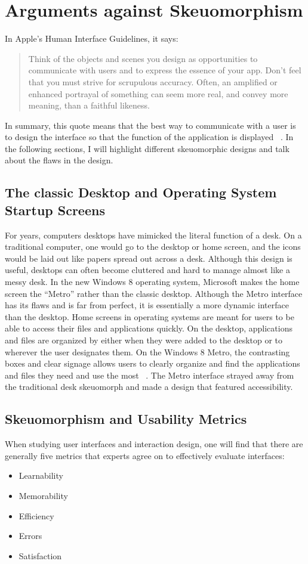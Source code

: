 \documentclass{article}
\begin{document}
\section{Arguments against Skeuomorphism}

In Apple’s Human Interface Guidelines, it says:

\begin{quote}Think of the objects and scenes you design as opportunities to communicate with users and to express the essence of your app. Don't feel that you must strive for scrupulous accuracy. Often, an amplified or enhanced portrayal of something can seem more real, and convey more meaning, than a faithful likeness.\end{quote}

In summary, this quote means that the best way to communicate with a user is to design the interface so that the function of the application is displayed ~\cite{Gizmodo}. In the following sections, I will highlight different skeuomorphic designs and talk about the flaws in the design.


\subsection{The classic Desktop and Operating System Startup Screens}
	For years, computers desktops have mimicked the literal function of a desk. On a traditional computer, one would go to the desktop or home screen, and the icons would be laid out like papers spread out across a desk. Although this design is useful, desktops can often become cluttered and hard to manage almost like a messy desk. In the new Windows 8 operating system, Microsoft makes the home screen the “Metro” rather than the classic desktop. Although the Metro interface has its flaws and is far from perfect, it is essentially a more dynamic interface than the desktop. Home screens in operating systems are meant for users to be able to access their files and applications quickly. On the desktop, applications and files are organized by either when they were added to the desktop or to wherever the user designates them. On the Windows 8 Metro, the contrasting boxes and clear signage allows users to clearly organize and find the applications and files they need and use the most ~\cite{Hobbs}. The Metro interface strayed away from the traditional desk skeuomorph and made a design that featured accessibility. 


\subsection{Skeuomorphism and Usability Metrics}
	When studying user interfaces and interaction design, one will find that there are generally five metrics that experts agree on to effectively evaluate interfaces: 
\begin{itemize}
\item Learnability 
\item Memorability 
\item Efficiency 
\item Errors 
\item Satisfaction 
\end{itemize}
\end{document}
